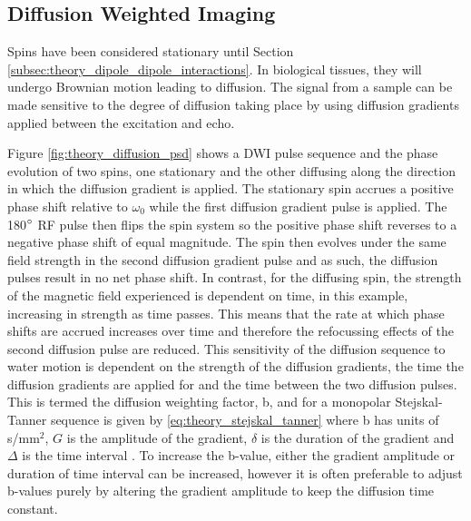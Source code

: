 
\subsection{Diffusion Weighted Imaging}
\label{subsec:theory_diffusion}
Spins have been considered stationary until Section \ref{subsec:theory_dipole_dipole_interactions}. In biological tissues, they will undergo Brownian motion leading to diffusion. The signal from a sample can be made sensitive to the degree of diffusion taking place by using diffusion gradients applied between the excitation and echo. 

Figure \ref{fig:theory_diffusion_psd} shows a \ac{DWI} pulse sequence and the phase evolution of two spins, one stationary and the other diffusing along the direction in which the diffusion gradient is applied. The stationary spin accrues a positive phase shift relative to $\omega_0$ while the first diffusion gradient pulse is applied. The 180$\degree$ \ac{RF} pulse then flips the spin system so the positive phase shift reverses to a negative phase shift of equal magnitude. The spin then evolves under the same field strength in the second diffusion gradient pulse and as such, the diffusion pulses result in no net phase shift. In contrast, for the diffusing spin, the strength of the magnetic field experienced is dependent on time, in this example, increasing in strength as time passes. This means that the rate at which phase shifts are accrued increases over time and therefore the refocussing effects of the second diffusion pulse are reduced. This sensitivity of the diffusion sequence to water motion is dependent on the strength of the diffusion gradients, the time the diffusion gradients are applied for and the time between the two diffusion pulses. This is termed the diffusion weighting factor, b, and for a monopolar Stejskal-Tanner sequence is given by \eqref{eq:theory_stejskal_tanner} where b has units of s/mm$^2$, $G$ is the amplitude of the gradient, $\delta$ is the duration of the gradient and $\Delta$ is the time interval \cite{stejskal_spin_1965}. To increase the b-value, either the gradient amplitude or duration of time interval can be increased, however it is often preferable to adjust b-values purely by altering the gradient amplitude to keep the diffusion time constant.

